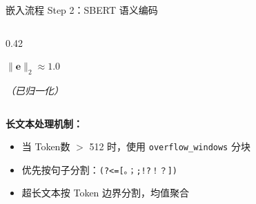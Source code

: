 \documentclass[aspectratio=169]{beamer}
\begin{document}
\begin{frame}{嵌入流程 Step 2：SBERT 语义编码}
\begin{columns}[T]
\begin{column}{0.42\textwidth}
{\begin{minipage}{0.95\textwidth}
$\|\mathbf{e}\|_2 \approx 1.0$

\vspace{0.1cm}
\textit{（已归一化）}
\end{minipage}%
}
\end{column}
\end{columns}

\vspace{0.4cm}

\textbf{长文本处理机制：}
\begin{itemize}
    \item 当 Token数 $>$ 512 时，使用 \texttt{overflow\_windows} 分块
    \item 优先按句子分割：\texttt{(?<=[。；;!?！？])}
    \item 超长文本按 Token 边界分割，均值聚合
\end{itemize}

\end{frame}
\end{document}
